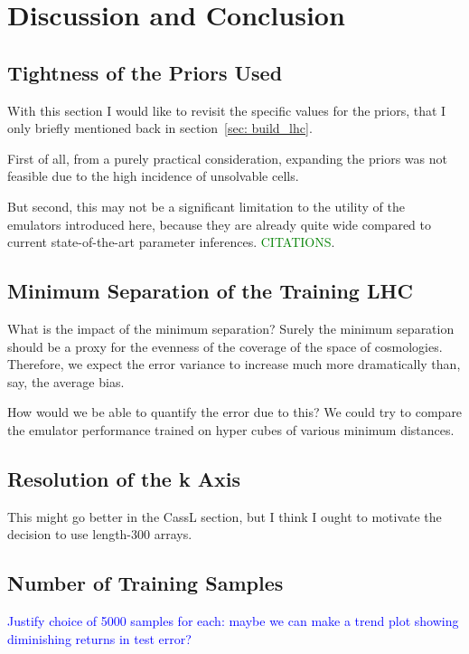 \chapter{Discussion and Conclusion}
\label{chap: disc_and_conc}

\section{Tightness of the Priors Used}
\label{sec: priors}

With this section I would like to revisit the specific values for the priors,
that I only briefly mentioned back in section~\ref{sec: build_lhc}.

First of all, from a purely practical consideration, expanding the priors was
not feasible due to the high incidence of unsolvable cells.

But second, this may not be a significant limitation to the utility of the
emulators introduced here, because they are already quite wide compared to
current state-of-the-art parameter inferences. \textcolor{green}{CITATIONS}.

\section{Minimum Separation of the Training LHC}
\label{sec: error_from_lhc}

What is the impact of the minimum separation? Surely the minimum separation
should be a proxy for the evenness of the coverage of the space of
cosmologies. Therefore, we expect the error variance to increase much more
dramatically than, say, the average bias.

How would we
be able to quantify the error due to this? We could try to compare the
emulator performance trained on hyper cubes of various minimum distances.

\section{Resolution of the k Axis}

This might go better in the CassL section, but I think I ought to motivate the decision to use length-300 arrays.

\section{Number of Training Samples}
\label{sec: num_samples}

\textcolor{blue}{Justify choice of 5000 samples for each: maybe we can make a
trend plot showing diminishing returns in test error?}

